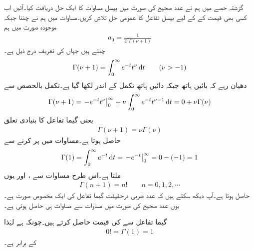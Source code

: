 گزشتہ حصے میں ہم نے عدد صحیح کی صورت میں بیسل مساوات کا ایک حل دریافت کیا۔آئیں اب کسی بھی قیمت کے  کے لیے بیسل تفاعل کا عمومی حل تلاش کریں۔مساوات  میں ہم نے  چننا جبکہ موجودہ صورت میں ہم
\begin{align}\label{مساوات_بیسل_عددی_سر_عمومی}
a_0=\frac{1}{2^\nu \Gamma (\nu+1)}
\end{align}
چنتے ہیں جہاں   کی تعریف درج ذیل ہے۔
\begin{align}\label{مساوات_بیسل_گیما_الف}
\Gamma(\nu+1)=\int_{0}^{\infty}e^{-t} t^{\nu}\dif t\quad \quad (\nu >-1)
\end{align}
دھیان رہے کہ بائیں ہاتھ  جبکہ دائیں ہاتھ تکمل کے اندر  لکھا گیا ہے۔تکمل بالحصص سے
\begin{align*}
\Gamma(\nu+1)=\left. -e^{-t}t^{\nu}\right|_{0}^{\infty}+\nu\int_{0}^{\infty} e^{-t}t^{\nu-1}\dif t=0+\nu\Gamma(\nu)
\end{align*}
یعنی گیما تفاعل کا بنیادی تعلق
\begin{align}\label{مساوات_بیسل_گیما_ب}
\Gamma(\nu+1)=\nu\Gamma(\nu)
\end{align}
حاصل ہوتا ہے۔مساوات  میں  پر کرنے سے 
\begin{align*}
\Gamma(1)=\int_{0}^{\infty}e^{-t}\dif t=\left.-e^{-t}\right|_{0}^{\infty}=0-(-1)=1
\end{align*}
ملتا ہے۔اس طرح مساوات  سے ،  اور یوں 
\begin{align}\label{مساوات_بیسل_گیما_بطور_عدد_ضربیہ}
\Gamma(n+1)=n!\quad \quad n=0,1,2,\cdots
\end{align}
حاصل ہوتا ہے۔آپ دیکھ سکتے ہیں کہ عدد ضربی درحقیقت گیما تفاعل کی ایک مخصوص صورت ہے۔یوں عدد صحیح  کی صورت میں مساوات  سے مساوات  ہی حاصل ہوتی ہے۔

گیما تفاعل سے  کی قیمت حاصل کرتے ہیں۔چونکہ  ہے لہٰذا 
\begin{align}\label{مساوات_بیسل_گیما_پ}
0!=\Gamma(1)=1
\end{align}
کے برابر ہے۔

